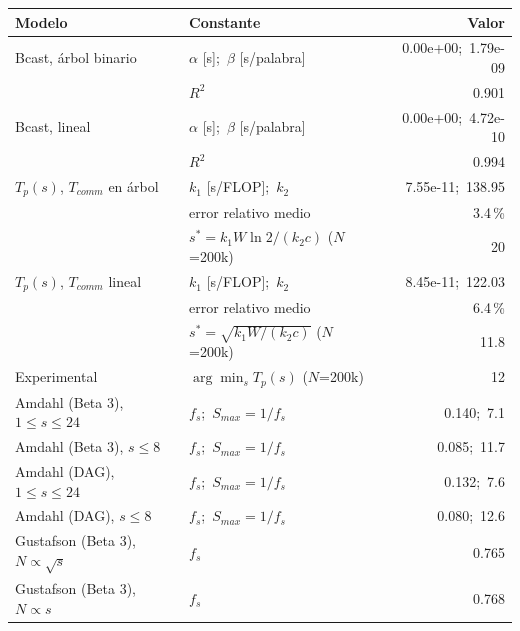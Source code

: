 \begin{tabular}{llr}
\toprule
Modelo & Constante & Valor \\
\midrule
Bcast, árbol binario & $\alpha$ [s];\ $\beta$ [s/palabra] & 0.00e+00;\ 1.79e-09 \\
 & $R^2$ & 0.901 \\
Bcast, lineal & $\alpha$ [s];\ $\beta$ [s/palabra] & 0.00e+00;\ 4.72e-10 \\
 & $R^2$ & 0.994 \\
\midrule
$T_p(s)$, $T_{comm}$ en árbol & $k_1$ [s/FLOP];\ $k_2$ & 7.55e-11;\ 138.95 \\
 & error relativo medio & 3.4\,\% \\
 & $s^*=k_1W\ln 2/(k_2c)$ ($N$=200k) & 20 \\
$T_p(s)$, $T_{comm}$ lineal & $k_1$ [s/FLOP];\ $k_2$ & 8.45e-11;\ 122.03 \\
 & error relativo medio & 6.4\,\% \\
 & $s^*=\sqrt{k_1W/(k_2c)}$ ($N$=200k) & 11.8 \\
Experimental & $\arg\min_s T_p(s)$ ($N$=200k) & 12 \\
\midrule
Amdahl (Beta 3), $1\le s\le 24$ & $f_s$;\ $S_{max}=1/f_s$ & 0.140;\ 7.1 \\
Amdahl (Beta 3), $s\le 8$ & $f_s$;\ $S_{max}=1/f_s$ & 0.085;\ 11.7 \\
Amdahl (DAG), $1\le s\le 24$ & $f_s$;\ $S_{max}=1/f_s$ & 0.132;\ 7.6 \\
Amdahl (DAG), $s\le 8$ & $f_s$;\ $S_{max}=1/f_s$ & 0.080;\ 12.6 \\
Gustafson (Beta 3), $N\propto\sqrt{s}$ & $f_s$ & 0.765 \\
Gustafson (Beta 3), $N\propto s$ & $f_s$ & 0.768 \\
\bottomrule
\end{tabular}